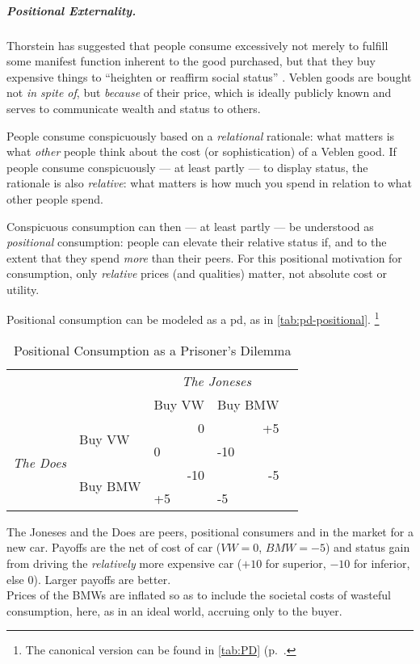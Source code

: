 \subparagraph{Positional Externality.}
	\label{sec:positional-race}
Thorstein \cite{Veblen1899} has suggested that people consume excessively not merely to fulfill some manifest function inherent to the good purchased, but that they buy expensive things to ``heighten or reaffirm social status'' \citep[123]{Merton-1968-aa}.
Veblen goods are bought not \emph{in spite of}, but \emph{because} of their price, which is ideally publicly known and serves to communicate wealth and status to others.

People consume conspicuously based on a \emph{relational} rationale:
what matters is what \emph{other} people think about the cost (or sophistication) of a Veblen good.
If people consume conspicuously --- at least partly --- to display status, the rationale is also \emph{relative}:
what matters is how much you spend in relation to what other people spend.

Conspicuous consumption can then --- at least partly --- be understood as \emph{positional} consumption:
people can elevate their relative status if, and to the extent that they spend \emph{more} than their peers.
For this positional motivation for consumption, only \emph{relative} prices (and qualities) matter, not absolute cost or utility.

Positional consumption can be modeled as a \gls{pd}, as in \autoref{tab:pd-positional}.
\footnote{
	The canonical version can be found in \autoref{tab:PD} (p.~\pageref{tab:PD}.
}

\begin{table}
	\caption{Positional Consumption as a Prisoner's Dilemma}
	\label{tab:pd-positional}
	\begin{center}
	\begin{tabular}{m{1cm}m{}m{}m{}m{}}
		& & \multicolumn{2}{c}{\emph{The Joneses}} \\
		& &Buy VW & Buy BMW\\
		\cline{3-4}
		\multicolumn{1}{c}{\multirow{4}{*}{\emph{The Does}}} & \multirow{2}{2,3cm}{Buy VW} & 		\multicolumn{1}{|r|}{0} & \multicolumn{1}{r|}{+5}\\
		\multicolumn{1}{c}{} & \multicolumn{1}{c}{}& \multicolumn{1}{|l|}{0} & \multicolumn{1}{l|}{-10}\\
		\cline{3-4}
		\multicolumn{1}{c}{} & \multirow{2}{2,3cm}{Buy BMW} & \multicolumn{1}{|r|}{-10} & \multicolumn{1}{r|}{-5}\\
		\multicolumn{1}{c}{} & \multicolumn{1}{c}{}& \multicolumn{1}{|l|}{+5} & \multicolumn{1}{l|}{-5}\\
		\cline{3-4}
	\end{tabular}
	\end{center}
	\scriptsize{The Joneses and the Does are peers, positional consumers and in the market for a new car.
Payoffs are the net of cost of car ($VW=0$, $BMW=-5$) and status gain from driving the \emph{relatively} more expensive car ($+10$ for superior, $-10$ for inferior, else $0$).
Larger payoffs are better.\\
	Prices of the BMWs are inflated so as to include the societal costs of wasteful consumption, here, as in an ideal world, accruing only to the buyer.}
\end{table}

